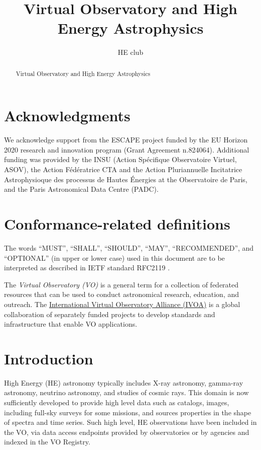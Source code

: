\documentclass[11pt,a4paper]{ivoa}
\title{Virtual Observatory and High Energy Astrophysics}
\author{HE club}
\begin{document}
\begin{abstract}
Virtual Observatory and High Energy Astrophysics
\end{abstract}


\section*{Acknowledgments}

We acknowledge support from the ESCAPE project funded by the EU Horizon 2020 research and innovation program (Grant Agreement n.824064).
Additional funding was provided by the INSU (Action Sp\'ecifique Observatoire Virtuel, ASOV), the Action F\'ed\'eratrice
CTA and the Action Pluriannuelle Incitatrice Astrophysioque des processus de Hautes \'Energies at the Observatoire de
Paris, and the Paris Astronomical Data Centre (PADC).

\section*{Conformance-related definitions}

The words ``MUST'', ``SHALL'', ``SHOULD'', ``MAY'', ``RECOMMENDED'', and
``OPTIONAL'' (in upper or lower case) used in this document are to be
interpreted as described in IETF standard RFC2119 \citep{std:RFC2119}.

The \emph{Virtual Observatory (VO)} is a
general term for a collection of federated resources that can be used
to conduct astronomical research, education, and outreach.
The \href{https://www.ivoa.net}{International
Virtual Observatory Alliance (IVOA)} is a global
collaboration of separately funded projects to develop standards and
infrastructure that enable VO applications.


\section{Introduction}


High Energy (HE) astronomy typically includes X-ray astronomy, gamma-ray astronomy, neutrino astronomy, and studies of cosmic rays. This domain is now sufficiently developed to provide high level data such as catalogs, images, including full-sky surveys for some missions, and sources properties in the shape of spectra and time series.
Such high level, HE observations have been included in the VO, via data access endpoints provided by observatories or by agencies and indexed in the VO Registry.
\end{document}
